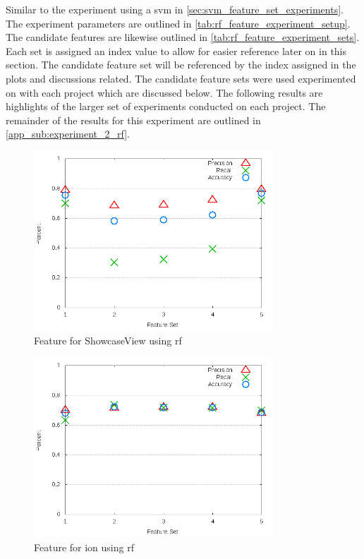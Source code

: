 
Similar to the experiment using a \gls{svm} in \autoref{sec:svm_feature_set_experiments}. The experiment parameters are outlined in \autoref{tab:rf_feature_experiment_setup}. The candidate features are likewise outlined in \autoref{tab:rf_feature_experiment_sets}. Each set is assigned an index value to allow for easier reference later on in this section. The candidate feature set will be referenced by the index assigned in the plots and discussions related. The candidate feature sets were used experimented on with each project which are discussed below. The following results are highlights of the larger set of experiments conducted on each project. The remainder of the results for this experiment are outlined in \autoref{app_sub:experiment_2_rf}.

\begin{figure}[!ht]
    \centering
        \includegraphics[width=0.8\textwidth]{images/rf/test_3/ShowcaseView_sample_range}
        \caption{Feature for ShowcaseView using \gls{rf}}
        \label{fig:test_3_ShowcaseView_rf}
\end{figure}

\begin{figure}[!ht]
    \centering
        \includegraphics[width=0.8\textwidth]{images/rf/test_3/ion_sample_range}
    \caption{Feature for ion using \gls{rf}}
    \label{fig:test_3_ion_rf}
\end{figure}

